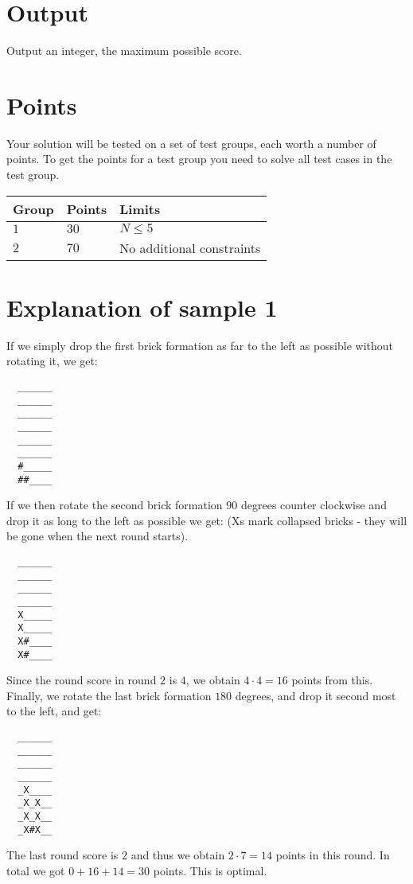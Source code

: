 \section*{Output}
\noindent
Output an integer, the maximum possible score.

\section*{Points}
\noindent
Your solution will be tested on a set of test groups, each worth a number of points.
To get the points for a test group you need to solve all test cases in the test group.

\noindent
\begin{tabular}{| l | l | p{12cm} |}
  \hline
  Group & Points & Limits \\ \hline
  $1$    & $30$       &  $N \leq 5$  \\ \hline 
  $2$    & $70$       &  No additional constraints \\ \hline
\end{tabular}

\section*{Explanation of sample 1}
\noindent
If we simply drop the first brick formation as far to the left as possible without rotating it, we
get:

\noindent
\begin{verbatim}
  ______
  ______
  ______
  ______
  ______
  ______
  #_____
  ##____
\end{verbatim}

If we then rotate the second brick formation $90$ degrees counter clockwise and drop it as
long to the left as possible we get: (Xs mark collapsed bricks - they will be gone when the
next round starts).

\noindent
\begin{verbatim}
  ______
  ______
  ______
  ______
  X_____
  X_____
  X#____
  X#____
\end{verbatim}

Since the round score in round $2$ is $4$, we obtain $4 \cdot 4 = 16$ points from this. Finally, we rotate
the last brick formation $180$ degrees, and drop it second most to the left, and get:

\noindent
\begin{verbatim}
  ______
  ______
  ______
  ______
  _X____
  _X_X__
  _X_X__
  _X#X__
\end{verbatim}

The last round score is $2$ and thus we obtain $2 \cdot 7 = 14$ points in this round. In total we got
$0 + 16 + 14 = 30$ points. This is optimal.